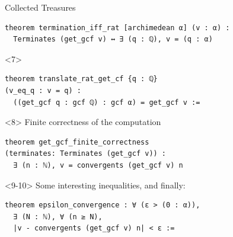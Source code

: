 \documentclass{beamer}
\begin{document}
\begin{frame}[fragile]{Collected Treasures}
\begin{onlyenv}
\begin{verbatim}
theorem termination_iff_rat [archimedean α] (v : α) :
  Terminates (get_gcf v) ↔ ∃ (q : ℚ), v = (q : α)
\end{verbatim}
\begin{visibleenv}<7>
\begin{verbatim}
theorem translate_rat_get_cf {q : ℚ}
(v_eq_q : v = q) :
  ((get_gcf q : gcf ℚ) : gcf α) = get_gcf v :=
\end{verbatim}
\end{visibleenv}
\end{onlyenv}
\begin{onlyenv}<8>
Finite correctness of the computation
\begin{verbatim}
theorem get_gcf_finite_correctness
(terminates: Terminates (get_gcf v)) :
  ∃ (n : ℕ), v = convergents (get_gcf v) n
\end{verbatim}
\end{onlyenv}
\begin{onlyenv}<9-10>
Some interesting inequalities, and finally:
\begin{verbatim}
theorem epsilon_convergence : ∀ (ε > (0 : α)),
  ∃ (N : ℕ), ∀ (n ≥ N),
  |v - convergents (get_gcf v) n| < ε :=
\end{verbatim}

\vspace{5mm}
\end{onlyenv}
\end{frame}
\end{document}
